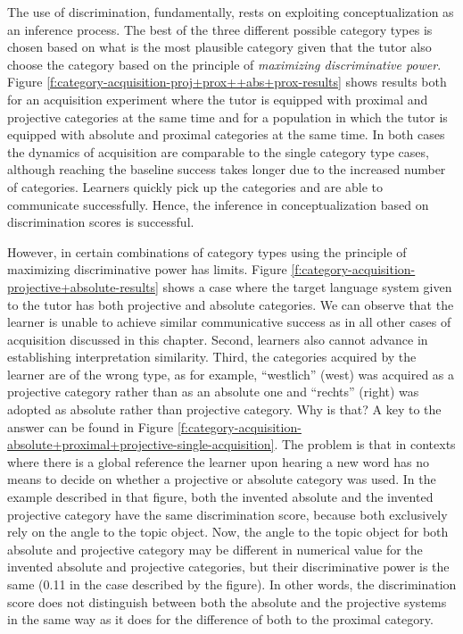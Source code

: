 The use of discrimination, fundamentally, rests on exploiting 
conceptualization as an inference process. The best of the three
different possible category types is chosen based on what is the most 
plausible category given that the tutor also choose the category based on 
the principle of \emph{maximizing discriminative power}.
Figure \ref{f:category-acquisition-proj+prox++abs+prox-results} 
shows results both for an
acquisition experiment where the tutor is equipped with proximal 
and projective categories at the same time and
for a population in which the tutor is equipped with
absolute and proximal categories at the same time. 
In both cases the dynamics of acquisition are comparable 
to the single category type cases, although reaching the baseline 
success takes longer due to the increased number of categories.
Learners quickly pick up the categories and are able to communicate 
successfully. Hence, the inference in conceptualization based on discrimination
scores is successful.

However, in certain combinations of category types using the 
principle of maximizing discriminative power has limits. 
Figure \ref{f:category-acquisition-projective+absolute-results} shows 
a case where the target language system
given to the tutor has both projective and absolute categories. We can observe
that the learner is unable to achieve similar communicative success as in all
other cases of acquisition discussed in this chapter. Second, learners also 
cannot advance in establishing interpretation similarity. Third, the categories
acquired by the learner are of the wrong type, as for example, ``westlich'' (west)
was acquired as a projective category rather than as an absolute one and ``rechts'' (right)
was adopted as absolute rather than projective category. Why is that?
A key to the answer can be found in Figure 
\ref{f:category-acquisition-absolute+proximal+projective-single-acquisition}. 
The problem is that in contexts where there is a global reference the learner
upon hearing a new word has no means to decide on whether a projective or 
absolute category was used. In the example described in that figure, both the invented 
absolute and the invented projective category have the same discrimination score, 
because both exclusively rely on the angle to the topic object. Now, the angle to the
topic object for both absolute and projective category may be different in numerical 
value for the invented absolute and projective categories, but their discriminative power 
is the same (0.11 in the case described by the figure). 
In other words, the discrimination score does not distinguish between both
the absolute and the projective systems in the same way as it does for the difference
of both to the proximal category. 

